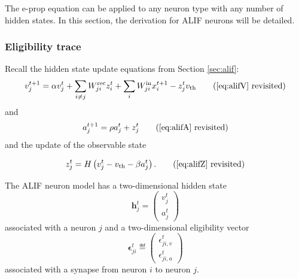         The e-prop equation can be applied to any neuron type with any number of hidden states.
        In this section, the derivation for ALIF neurons will be detailed.



        \subsubsection{Eligibility trace}
            Recall the hidden state update equations from Section \ref{sec:alif}:
            \begin{equation*}
            v^{t+1}_j = \alpha v_j^t + \sum_{i\neq j}W^\text{rec}_{ji}z_i^t + \sum_i W^\text{in}_{ji}x_i^{t+1} - z_j^tv_
            \text{th} \tag{\ref{eq:alifV} revisited}
            \end{equation*}
            and
            \begin{equation*}
            a^{t+1}_j = \rho a^t_j + z^t_j \tag{\ref{eq:alifA} revisited}
            \end{equation*}
            and the update of the observable state

            \begin{equation*}
            z^t_j = H\left(v_j^t - v_\text{th} - \beta a^t_j\right). \tag{\ref{eq:alifZ} revisited}
            \end{equation*}

            The ALIF neuron model has a two-dimensional hidden state
            \begin{equation}
            \mathbf{h}^t_j = \begin{pmatrix}
            v^t_j\\
            a^t_j
            \end{pmatrix}
            \end{equation}
            associated with a neuron $j$ and a two-dimensional eligibility vector
            \begin{equation}
            \mathbf{\epsilon}^t_{ji} \eqdef \begin{pmatrix}
            \epsilon_{ji, v}^t\\
            \epsilon_{ji, a}^t
            \end{pmatrix}
            \end{equation}
            associated with a synapse from neuron $i$ to neuron $j$.

